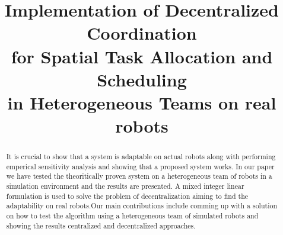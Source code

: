 \documentclass[conference]{IEEEtran}
\begin{document}
%
\title{Implementation of Decentralized Coordination\\ for Spatial Task Allocation
and Scheduling\\ in Heterogeneous Teams on real robots}


\author{
\and 
{}
}


% 
\maketitle

\begin{abstract}
It is crucial to show that a system is adaptable on actual robots along with performing emperical sensitivity analysis and showing that a proposed system works. In our paper we have tested the theoritically proven system on a heterogeneous team of robots in a simulation environment and the results are presented. A mixed integer linear formulation\cite{feo2016decentralized} is used to solve the problem of decentralization aiming to find the adaptability on real robots.Our main contributions include comming up with a solution on how to test the algorithm using a heterogeneous team of simulated robots and showing the results centralized and decentralized approaches.  
\end{abstract}
\end{document}
